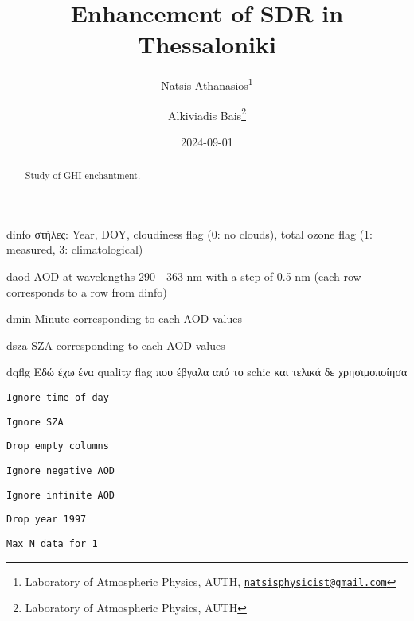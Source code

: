 \documentclass[
  10pt,
  a4paper,oneside]{article}
\title{Enhancement of SDR in Thessaloniki}
\author{Natsis Athanasios\footnote{Laboratory of Atmospheric Physics, AUTH, \href{mailto:natsisphysicist@gmail.com}{\nolinkurl{natsisphysicist@gmail.com}}} \and Alkiviadis Bais\footnote{Laboratory of Atmospheric Physics, AUTH}}
\date{2024-09-01}
\begin{document}
\maketitle
\begin{abstract}
Study of GHI enchantment.
\end{abstract}

{
\hypersetup{linkcolor=}
\setcounter{tocdepth}{4}
\tableofcontents
}
dinfo
στήλες: Year, DOY, cloudiness flag (0: no clouds), total ozone flag (1: measured, 3: climatological)

daod
AOD at wavelengths 290 - 363 nm with a step of 0.5 nm (each row corresponds to a row from dinfo)

dmin
Minute corresponding to each AOD values

dsza
SZA corresponding to each AOD values

dqflg
Εδώ έχω ένα quality flag που έβγαλα από το schic και τελικά δε χρησιμοποίησα

\begin{verbatim}
Ignore time of day
\end{verbatim}

\begin{verbatim}
Ignore SZA
\end{verbatim}

\begin{verbatim}
Drop empty columns
\end{verbatim}

\begin{verbatim}
Ignore negative AOD
\end{verbatim}

\begin{verbatim}
Ignore infinite AOD
\end{verbatim}

\begin{verbatim}
Drop year 1997
\end{verbatim}

\begin{verbatim}
Max N data for 1 
\end{verbatim}
\end{document}
